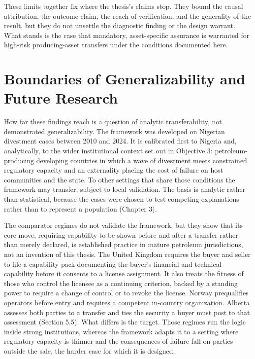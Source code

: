 These limits together fix where the thesis's claims stop. They bound the
causal attribution, the outcome claim, the reach of verification, and
the generality of the result, but they do not unsettle the diagnostic
finding or the design warrant. What stands is the case that mandatory,
asset-specific assurance is warranted for high-risk producing-asset
transfers under the conditions documented here.

\hypertarget{boundaries-of-generalizability-and-future-research}{%
\section{Boundaries of Generalizability and Future
Research}\label{boundaries-of-generalizability-and-future-research}}

How far these findings reach is a question of analytic transferability,
not demonstrated generalizability. The framework was developed on
Nigerian divestment cases between 2010 and 2024. It is calibrated first
to Nigeria and, analytically, to the wider institutional context set out
in Objective 3: petroleum-producing developing countries in which a wave
of divestment meets constrained regulatory capacity and an externality
placing the cost of failure on host communities and the state. To other
settings that share those conditions the framework may transfer, subject
to local validation. The basis is analytic rather than statistical,
because the cases were chosen to test competing explanations rather than
to represent a population (Chapter 3).

The comparator regimes do not validate the framework, but they show that
its core move, requiring capability to be shown before and after a
transfer rather than merely declared, is established practice in mature
petroleum jurisdictions, not an invention of this thesis. The United
Kingdom requires the buyer and seller to file a capability pack
documenting the buyer's financial and technical capability before it
consents to a license assignment. It also treats the fitness of those
who control the licensee as a continuing criterion, backed by a standing
power to require a change of control or to revoke the license. Norway
prequalifies operators before entry and requires a competent in-country
organization. Alberta assesses both parties to a transfer and ties the
security a buyer must post to that assessment (Section 5.5). What
differs is the target. Those regimes run the logic inside strong
institutions, whereas the framework adapts it to a setting where
regulatory capacity is thinner and the consequences of failure fall on
parties outside the sale, the harder case for which it is designed.


